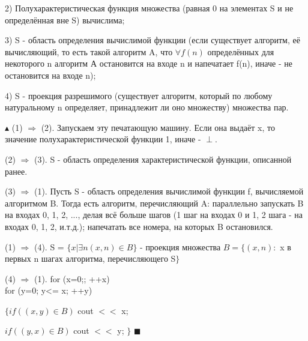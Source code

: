2) Полухарактеристическая функция множества (равная 0 на элементах S и не определённая вне S) вычислима;

3) S - область определения вычислимой функции (если существует алгоритм, её вычисляющий, то
есть такой алгоритм A, что $\forall f(n)$ определённых для некоторого n алгоритм А остановится на входе n и напечатает f(n), иначе - не остановится на входе n);

4) S - проекция разрешимого (существует алгоритм, который по любому натуральному n определяет, принадлежит ли оно множеству) множества пар.

$\blacktriangle$
(1) $\Rightarrow$ (2). Запускаем эту печатающую машину. Если она выдаёт x, то значение полухарактеристической функции 1, иначе - $\perp$.

(2) $\Rightarrow$ (3). S - область определения характеристической функции, описанной ранее.

(3) $\Rightarrow$ (1). Пусть S - область определения вычислимой функции f, вычисляемой алгоритмом B. Тогда есть алгоритм, перечисляющий A: параллельно запускать B на входах 0, 1, 2, ..., делая всё больше шагов (1 шаг на входах 0 и 1, 2 шага - на входах 0, 1, 2, и.т.д.); напечатать все номера, на которых B остановился. 

(1) $\Rightarrow$ (4). S = $\{ x | \exists n (x, n) \in B\}$ - проекция множества $B = \{ (x, n):$ x в первых n шагах алгоритма, перечисляющего S$\}$

(4) $\Rightarrow$ (1). for (x=0;; ++x) \\
for (y=0; y<= x; ++y) 

    $\{ if ((x, y) \in B)$ cout $<<$ x;

    $if ((y, x) \in B)$ cout $<<$ y; $\}$
$\blacksquare$

